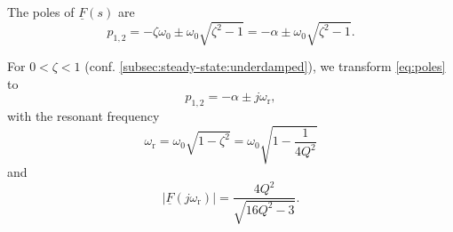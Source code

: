 \documentclass{article}[11pt]
\begin{document}
\medskip

The poles of $\underline{F}(s)$ are
\begin{equation}\label{eq:poles}
p_{1,2} = - \zeta \omega_0 \pm \omega_0 \sqrt{\zeta^2-1} = - \alpha \pm \omega_0 \sqrt{\zeta^2-1}.
\end{equation}

\medskip

For $0<\zeta < 1$ (conf. \ref{subsec:steady-state:underdamped}), we transform 
\eqref{eq:poles} to
\begin{equation}\label{eq:poles-underdamped}
p_{1,2} = - \alpha \pm j \omega_{\mathrm{r}},
\end{equation}
with the resonant frequency 
\begin{equation}\label{eq:poles}
\omega_{\mathrm{r}} = \omega_0 \sqrt{1-\zeta^2} = \omega_0 \sqrt{1-\frac{1}{4 Q^2}}
\end{equation}
and
\begin{equation}
\left|\underline{F}(j\omega_{\mathrm{r}})\right| = \frac{4 Q^2}{\sqrt{16 Q^2 -3}}.
\end{equation}
\end{document}
